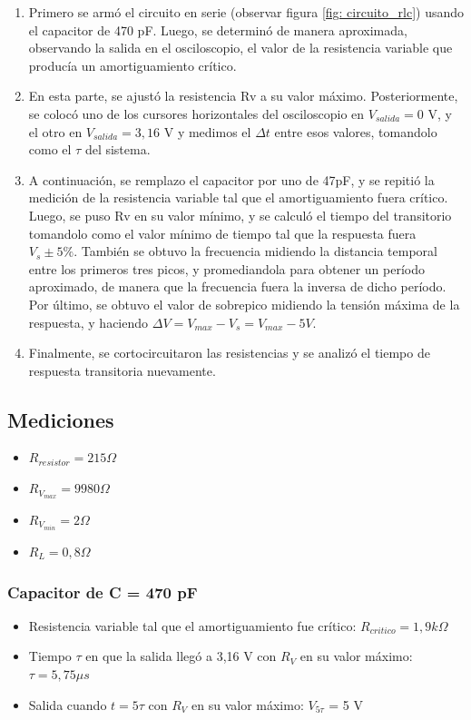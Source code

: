 \documentclass{article}
\begin{document}
    \begin{enumerate}
        \item Primero se armó el circuito en serie (observar figura \ref{fig: circuito_rlc}) usando el capacitor de 470 pF. Luego, se determinó de manera aproximada, observando la salida en el osciloscopio, el valor de la resistencia variable que producía un amortiguamiento crítico.
        \item En esta parte, se ajustó la resistencia Rv a su valor máximo. Posteriormente, se colocó uno de los cursores horizontales del osciloscopio en $ V_{salida}=0$ V, y el otro en $ V_{salida}=3,16$ V y medimos el $ \Delta t $ entre esos valores, tomandolo como el $\tau$ del sistema.
        \item A continuación, se remplazo el capacitor por uno de 47pF, y se repitió la medición de la resistencia variable tal que el amortiguamiento fuera crítico. Luego, se puso Rv en su valor mínimo, y se calculó el tiempo del transitorio tomandolo como el valor mínimo de tiempo tal que la respuesta fuera $V_s \pm 5\% $. También se obtuvo la frecuencia midiendo la distancia temporal entre los primeros tres picos, y promediandola para obtener un período aproximado, de manera que la frecuencia fuera la inversa de dicho período. Por último, se obtuvo el valor de sobrepico midiendo la tensión máxima de la respuesta, y haciendo $ \Delta V = V_{max} - V_s = V_{max} - 5 V $.
        \item Finalmente, se cortocircuitaron las resistencias y se analizó el tiempo de respuesta transitoria nuevamente.
        
    \end{enumerate}
    \subsection{Mediciones}
 
        \begin{itemize}
            \item $ R_{resistor} = 215 \Omega $
            \item $ R_{V_{max}} = 9980 \Omega $
            \item $ R_{V_{min}} = 2 \Omega $
            \item $ R_L = 0,8 \Omega $
        \end{itemize}
        
        \par
        \subsubsection*{Capacitor de C = 470 pF}
            \begin{itemize}
                \item Resistencia variable tal que el amortiguamiento fue crítico: $ R_{critico} = 1,9 k\Omega $ %
                \item Tiempo $\tau$ en que la salida llegó a 3,16 V con $ R_V $ en su valor máximo: $ \tau = 5,75 \mu s$ %
                \item Salida cuando $t=5\tau$ con $ R_V $ en su valor máximo: $V_{5\tau}$ = 5 V%
            \end{itemize}
\end{document}
